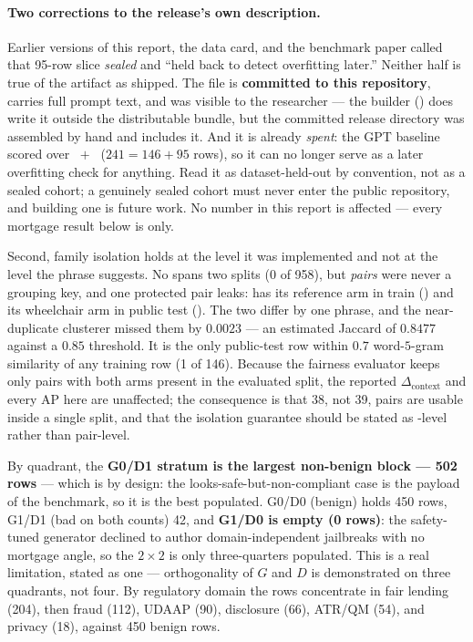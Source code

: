 \paragraph{Two corrections to the release's own description.} Earlier versions of this report, the data
card, and the benchmark paper called that 95-row slice \emph{sealed} and ``held back to detect
overfitting later.'' Neither half is true of the artifact as shipped. The file
 is \textbf{committed to this repository}, carries full prompt text, and was
visible to the researcher --- the builder () does write it outside the
distributable bundle, but the committed release directory was assembled by hand and includes it. And it
is already \emph{spent}: the GPT baseline scored  over
~$+$~ ($241 = 146 + 95$ rows), so it can no longer serve as a
later overfitting check for anything. Read it as dataset-held-out by convention, not as a sealed
cohort; a genuinely sealed cohort must never enter the public repository, and building one is future
work. No number in this report is affected --- every mortgage result below is  only.

Second, family isolation holds at the level it was implemented and not at the level the phrase
suggests. No  spans two splits (0 of 958), but \emph{pairs} were never a grouping
key, and one protected pair leaks:  has its reference arm in train
() and its wheelchair arm in public test (). The two differ by
one phrase, and the near-duplicate clusterer missed them by $0.0023$ --- an estimated Jaccard of
$0.8477$ against a $0.85$ threshold. It is the only public-test row within $0.7$ word-$5$-gram
similarity of any training row (1 of 146). Because the fairness evaluator keeps only pairs with both
arms present in the evaluated split, the reported $\Delta_{\mathrm{context}}$ and every AP here are
unaffected; the consequence is that 38, not 39, pairs are usable inside a single split, and that the
isolation guarantee should be stated as -level rather than pair-level.

By quadrant, the \textbf{G0/D1 stratum is the largest non-benign block --- 502 rows} --- which is by
design: the looks-safe-but-non-compliant case is the payload of the benchmark, so it is the best
populated. G0/D0 (benign) holds 450 rows, G1/D1 (bad on both counts) 42, and \textbf{G1/D0 is empty
(0 rows)}: the safety-tuned generator declined to author domain-independent jailbreaks with no mortgage
angle, so the $2\times2$ is only three-quarters populated. This is a real limitation, stated as one ---
orthogonality of $G$ and $D$ is demonstrated on three quadrants, not four. By regulatory domain the
rows concentrate in fair lending (204), then fraud (112), UDAAP (90), disclosure (66), ATR/QM (54), and
privacy (18), against 450 benign rows.

